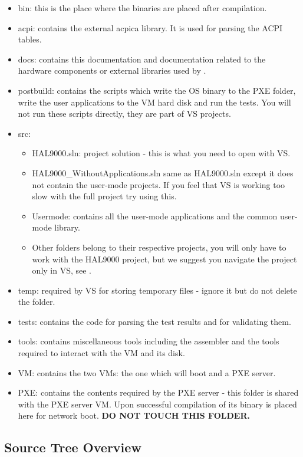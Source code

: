 \begin{itemize}
	\item bin: this is the place where the binaries are placed after compilation.
	\item acpi: contains the external acpica library. It is used for parsing the ACPI tables.
	\item docs: contains this documentation and documentation related to the hardware components or
external libraries used by \projectname.
	\item postbuild: contains the scripts which write the OS binary to the PXE folder, write
the user applications to the VM hard disk and run the tests. You will not run these scripts directly, they are part of VS projects.
	\item src:
		\begin{itemize}
			\item HAL9000.sln: project solution - this is what you need to open with VS.
			\item HAL9000\_WithoutApplications.sln same as HAL9000.sln except it does not contain
		the user-mode projects. If you feel that VS is working too slow with the full project try
		using this.
			\item Usermode: contains all the user-mode applications and the common user-mode library.
			\item Other folders belong to their respective projects, you will only have to work with
		the HAL9000 project, but we suggest you navigate the project only in VS, see
		.
		\end{itemize}
	\item temp: required by VS for storing temporary files - ignore it but do not delete the folder.
	\item tests: contains the code for parsing the test results and for validating them.
	\item tools: contains miscellaneous tools including the assembler and the tools required to
	interact with the VM and its disk.
	\item VM: contains the two VMs: the one which will boot \projectname and a PXE server.
	\item PXE: contains the contents required by the PXE server - this folder is shared with the
	PXE server VM. Upon successful compilation of \projectname its binary is placed here for network
	boot. \textbf{DO NOT TOUCH THIS FOLDER.}
\end{itemize}

\subsection{Source Tree Overview}
\label{sect:SourceTree}

